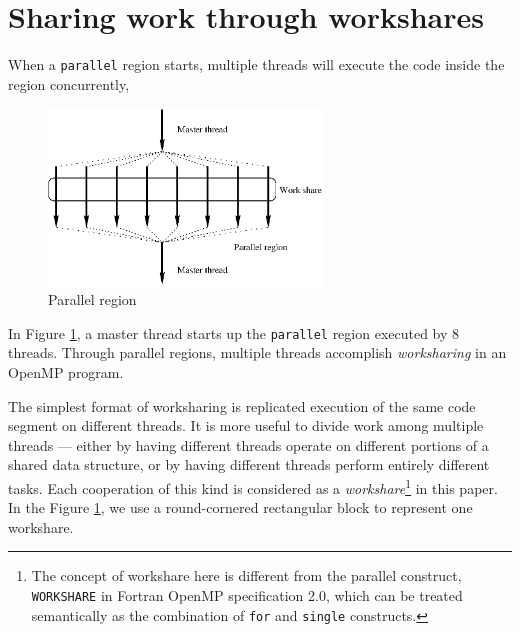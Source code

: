\section{Sharing work through workshares}


When a \texttt{parallel} region starts, multiple threads will execute the code
inside the region concurrently,

\begin{figure}[!h]
  \begin{center}
    \includegraphics[angle=0, width=0.65\textwidth]{parregion.eps}
    \caption{\footnotesize Parallel region}
    \label{fig:parregion}
  \end{center}
\end{figure}

In Figure \ref{fig:parregion}, a master thread starts up the \texttt{parallel}
region executed by 8 threads. Through parallel regions, multiple threads
accomplish \emph{worksharing} in an OpenMP program.

The simplest format of worksharing is replicated execution of the same code
segment on different threads. It is more useful to divide work among multiple
threads --- either by having different threads operate on different portions of
a shared data structure, or by having different threads perform entirely
different tasks. Each cooperation of this kind is considered as a
\emph{workshare}\footnote{The concept of workshare here is different from the
parallel construct, \texttt{WORKSHARE} in Fortran OpenMP specification 2.0,
which can be treated semantically as the combination of \texttt{for} and
\texttt{single} constructs.} in this paper. In the Figure \ref{fig:parregion}, we use a
round-cornered rectangular block to represent one workshare.


